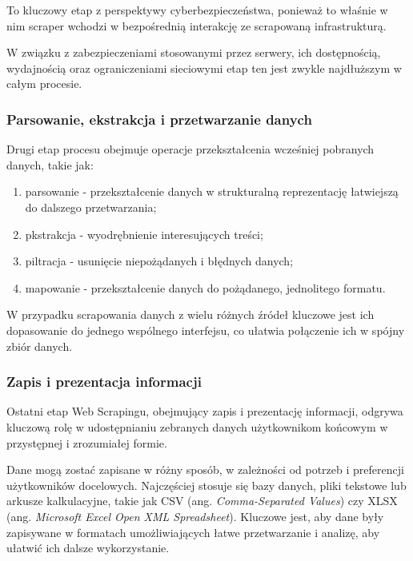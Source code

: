 To kluczowy etap z perspektywy cyberbezpieczeństwa, ponieważ to właśnie w nim scraper wchodzi w bezpośrednią interakcję ze scrapowaną infrastrukturą.

W związku z zabezpieczeniami stosowanymi przez serwery, ich dostępnością, wydajnością oraz ograniczeniami sieciowymi etap ten jest zwykle najdłuższym w całym procesie.

\subsubsection{Parsowanie, ekstrakcja i przetwarzanie danych}

Drugi etap procesu obejmuje operacje przekształcenia wcześniej pobranych danych, takie jak:
\begin{enumerate}
    \item parsowanie - przekształcenie danych w strukturalną reprezentację łatwiejszą do dalszego przetwarzania;
    \item pkstrakcja - wyodrębnienie interesujących treści;
    \item piltracja - usunięcie niepożądanych i błędnych danych;
    \item mapowanie - przekształcenie danych do pożądanego, jednolitego formatu.
\end{enumerate}

\noindent W przypadku scrapowania danych z wielu różnych źródeł kluczowe jest ich dopasowanie do jednego wspólnego interfejsu, co ułatwia połączenie ich w spójny zbiór danych.

\subsubsection{Zapis i prezentacja informacji}

Ostatni etap Web Scrapingu, obejmujący zapis i prezentację informacji, odgrywa kluczową rolę w udostępnianiu zebranych danych użytkownikom końcowym w przystępnej i zrozumiałej formie\cite{iee-state-of-the-art}.

Dane mogą zostać zapisane w różny sposób, w zależności od potrzeb i preferencji użytkowników docelowych.
Najczęściej stosuje się bazy danych, pliki tekstowe lub arkusze kalkulacyjne, takie jak CSV (ang. \emph{Comma-Separated Values}) czy XLSX (ang. \emph{Microsoft Excel Open XML Spreadsheet}).
Kluczowe jest, aby dane były zapisywane w formatach umożliwiających łatwe przetwarzanie i analizę, aby ułatwić ich dalsze wykorzystanie\cite{iee-state-of-the-art}.

